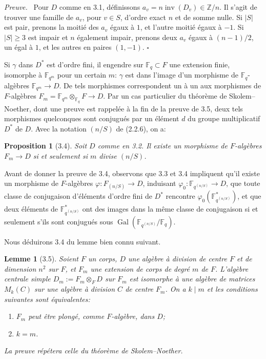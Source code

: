 \documentclass[10pt]{article}
\newcommand{\Fq}{\mathbb F_q}
\newcommand{\Z}{\mathbb Z}
\newcommand{\Gal}{\operatorname{Gal}}
\newcommand{\inv}{\operatorname{inv}}
\theoremstyle{deligne}
\newtheorem*{proposition*}{Proposition}
\newtheorem*{lemma*}{Lemme}
\newenvironment{proofdel}[1][Preuve.]{\textit{#1}\ }{\hfill$\square$}
\newcommand{\heading}[1]{\vspace{0.7em}\noindent{\bfseries #1}\quad}
\begin{document}
\begin{proofdel}
Pour $D$ comme en 3.1, définissons $a_v=n\inv(D_v)\in\Z/n$. Il s'agit de trouver une famille de $a_v$, pour $v\in S$, d'ordre exact $n$ et de somme nulle. Si $|S|$ est pair, prenons la moitié des $a_v$ égaux à $1$, et l'autre moitié égaux à $-1$. Si $|S|\ge3$ est impair et $n$ également impair, prenons deux $a_v$ égaux à $(n-1)/2$, un égal à $1$, et les autres en paires $(1,-1)$.
\end{proofdel}

\heading{3.3.} Si $\gamma$ dans $D^*$ est d'ordre fini, il engendre sur $\Fq\subset F$ une extension finie, isomorphe à $\mathbb F_{q^m}$ pour un certain $m$: $\gamma$ est dans l'image d'un morphisme de $\Fq$-algèbres $\mathbb F_{q^m}\to D$. De tels morphismes correspondent un à un aux morphismes de $F$-algèbres $F_m=\mathbb F_{q^m}\otimes_{\Fq}F\to D$. Par un cas particulier du théorème de Skolem--Noether, dont une preuve est rappelée à la fin de la preuve de 3.5, deux tels morphismes quelconques sont conjugués par un élément $d$ du groupe multiplicatif $D^*$ de $D$. Avec la notation $(n/S)$ de (2.2.6), on a:

\begin{proposition*}[3.4]
Soit $D$ comme en 3.2. Il existe un morphisme de $F$-algèbres $F_m\to D$ si et seulement si $m$ divise $(n/S)$.
\end{proposition*}

Avant de donner la preuve de 3.4, observons que 3.3 et 3.4 impliquent qu'il existe un morphisme de $F$-algèbres $\varphi:F_{(n/S)}\to D$, induisant $\varphi_0:\mathbb F_{q^{(n/S)}}\to D$, que toute classe de conjugaison d'éléments d'ordre fini de $D^*$ rencontre $\varphi_0(\mathbb F_{q^{(n/S)}}^*)$, et que deux éléments de $\mathbb F_{q^{(n/S)}}^*$ ont des images dans la même classe de conjugaison si et seulement s'ils sont conjugués sous $\Gal(\mathbb F_{q^{(n/S)}}/\Fq)$.

Nous déduirons 3.4 du lemme bien connu suivant.

\begin{lemma*}[3.5]
Soient $F$ un corps, $D$ une algèbre à division de centre $F$ et de dimension $n^2$ sur $F$, et $F_m$ une extension de corps de degré $m$ de $F$. L'algèbre centrale simple $D_m:=F_m\otimes_FD$ sur $F_m$ est isomorphe à une algèbre de matrices $M_k(C)$ sur une algèbre à division $C$ de centre $F_m$. On a $k\mid m$ et les conditions suivantes sont équivalentes:
\begin{enumerate}[label=(\roman*)]
\item $F_m$ peut être plongé, comme $F$-algèbre, dans $D$;
\item $k=m$.
\end{enumerate}
La preuve répétera celle du théorème de Skolem--Noether.
\end{lemma*}
\end{document}
